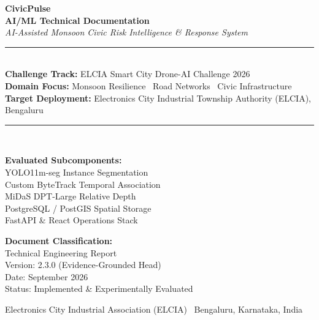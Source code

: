 \documentclass[11pt,a4paper]{article}
\begin{document}
\begin{titlepage}
    \centering
    \vspace*{1.5cm}
    
    {\Huge\bfseries\color{civicdark} CivicPulse}\\[0.4cm]
    {\LARGE\bfseries\color{civicblue} AI/ML Technical Documentation}\\[0.3cm]
    {\large\textit{AI-Assisted Monsoon Civic Risk Intelligence \& Response System}}\\[1.2cm]
    
    \rule{\textwidth}{1.2pt}\\[0.6cm]
    
    \textbf{Challenge Track:} ELCIA Smart City Drone-AI Challenge 2026\\
    \textbf{Domain Focus:} Monsoon Resilience \textbullet\ Road Networks \textbullet\ Civic Infrastructure\\
    \textbf{Target Deployment:} Electronics City Industrial Township Authority (ELCIA), Bengaluru\\[0.8cm]
    
    \rule{\textwidth}{1.2pt}\\[1.5cm]
    
    \begin{minipage}{0.48\textwidth}
        \begin{flushleft} \large
            \textbf{Evaluated Subcomponents:}\\
            YOLO11m-seg Instance Segmentation\\
            Custom ByteTrack Temporal Association\\
            MiDaS DPT-Large Relative Depth\\
            PostgreSQL / PostGIS Spatial Storage\\
            FastAPI \& React Operations Stack
        \end{flushleft}
    \end{minipage}
    \begin{minipage}{0.48\textwidth}
        \begin{flushright} \large
            \textbf{Document Classification:}\\
            Technical Engineering Report\\
            Version: 2.3.0 (Evidence-Grounded Head)\\
            Date: September 2026\\
            Status: Implemented \& Experimentally Evaluated
        \end{flushright}
    \end{minipage}
    
    \vfill
    {\small\color{civicgray} Electronics City Industrial Association (ELCIA) \textbullet\ Bengaluru, Karnataka, India}
\end{titlepage}
\end{document}
